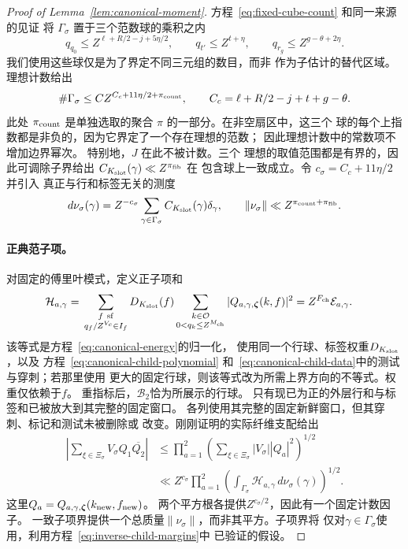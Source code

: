\documentclass[11pt,a4paper]{article}
\numberwithin{equation}{section}
\numberwithin{figure}{section}
\theoremstyle{definition}
\theoremstyle{remark}
\begin{document}
\begin{proof}[Proof of Lemma~\ref{lem:canonical-moment}]
方程~\eqref{eq:fixed-cube-count} 和同一来源的见证
将 \(\Gamma_\sigma\) 置于三个范数球的乘积之内
\[
 q_{q_0}\le Z^{\ell+R/2-j+5\eta/2},\qquad
 q_{t'}\le Z^{t+\eta},\qquad q_{r_g}\le Z^{g-\theta+2\eta}.
\]
我们使用这些球仅是为了界定不同三元组的数目，而非
作为子估计的替代区域。理想计数给出
\begin{equation}\label{eq:canonical-fixed-count}
 \#\Gamma_\sigma\le C Z^{C_c+11\eta/2+\pi_{\rm count}},\qquad
 C_c=\ell+R/2-j+t+g-\theta.
\end{equation}
此处 \(\pi_{\rm count}\) 是单独选取的聚合
\(\pi\) 的一部分。在非空扇区中，这三个
球的每个上指数都是非负的，因为它界定了一个存在理想的范数；
因此理想计数中的常数项不增加边界幂次。
特别地，\(J\) 在此不被计数。三个
理想的取值范围都是有界的，因此可调除子界给出
\(C_{K_{\rm slot}}(\gamma)\ll Z^{\pi_{\rm fib}}\) 在
包含球上一致成立。令 \(c_\sigma=C_c+11\eta/2\) 并引入
真正与行和标签无关的测度
\begin{equation}\label{eq:inverse-normalized-triples}
 d\nu_\sigma(\gamma)=Z^{-c_\sigma}
 \sum_{\gamma\in\Gamma_\sigma}C_{K_{\rm slot}}(\gamma)\delta_\gamma,
 \qquad \|\nu_\sigma\|\ll Z^{\pi_{\rm count}+\pi_{\rm fib}}.
\end{equation}\paragraph{正典范子项。}
对固定的傅里叶模式，定义正子项和
\begin{equation}\label{eq:inverse-positive-child}
 \begin{split}
 \mathcal H_{a,\gamma}={}&
 \sum_{\substack{f\ {\rm sf}\\q_f/Z^{V_c}\in I_f}}
 D_{K_{\rm slot}}(f)
 \sum_{\substack{k\in\mathcal O\\0<q_k\le Z^{M_{\rm ch}}}}
 |Q_{a,\gamma,\boldsymbol\zeta}(k,f)|^2
 =Z^{F_{\rm ch}}\mathcal E_{a,\gamma}.
 \end{split}
\end{equation}
该等式是方程~\eqref{eq:canonical-energy}的归一化，
使用同一个行球、标签权重\(D_{K_{\rm slot}}\)，以及
方程~\eqref{eq:canonical-child-polynomial}
和~\eqref{eq:canonical-child-data}中的测试与穿刺；若那里使用
更大的固定行球，则该等式改为所需上界方向的不等式。权重仅依赖于\(f\)。
重指标后，\(\mathcal B_2\)恰为所展示的行球。
只有现已为正的外层行和与标签和已被放大到其完整的固定窗口。
各列使用其完整的固定新鲜窗口，但其穿刺、标记和测试未被删除或
改变。刚刚证明的实际纤维支配给出
\[
 \begin{split}
 \left|\sum_{\xi\in\Xi_\sigma}V_\sigma Q_1\overline{Q_2}\right|
 &\le\prod_{a=1}^2
       \left(\sum_{\xi\in\Xi_\sigma}|V_\sigma||Q_a|^2\right)^{1/2}\\
 &\ll Z^{c_\sigma}\prod_{a=1}^2
       \left(\int_{\Gamma_\sigma}\mathcal H_{a,\gamma}
                    \,d\nu_\sigma(\gamma)\right)^{1/2}.
 \end{split}
\]
这里\(Q_a=Q_{a,\gamma,\boldsymbol\zeta}(k_{\rm new},f_{\rm new})\)。
两个平方根各提供\(Z^{c_\sigma/2}\)，因此有一个固定计数因子。
一致子项界提供一个总质量\(\|\nu_\sigma\|\)，而非其平方。子项界将
仅对\(\gamma\in\Gamma_\sigma\)使用，利用方程~\eqref{eq:inverse-child-margins}中
已验证的假设。


\end{proof}
\end{document}
